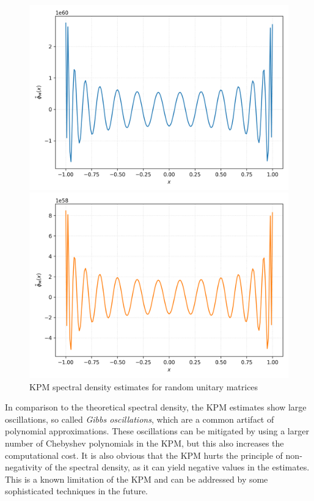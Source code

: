 \begin{figure}[H]
    \centering
    \begin{minipage}{0.49\textwidth}
        \centering
        \includegraphics[width=\textwidth]{Graphics/svd_kpm.png}
    \end{minipage}
    \hfill
    \begin{minipage}{0.49\textwidth}
        \centering
        \includegraphics[width=\textwidth]{Graphics/qr_kpm.png}
    \end{minipage}
    \caption{KPM spectral density estimates for random unitary matrices}
    \label{fig:compare_svd_qr_kpm}
\end{figure}

In comparison to the theoretical spectral density, the KPM estimates show large oscillations, so called \emph{Gibbs oscillations}, which are a common artifact of polynomial approximations. These oscillations can be mitigated by using a larger number of Chebyshev polynomials in the KPM, but this also increases the computational cost. It is also obvious that the KPM hurts the principle of non-negativity of the spectral density, as it can yield negative values in the estimates. This is a known limitation of the KPM and can be addressed by some sophisticated techniques in the future.

